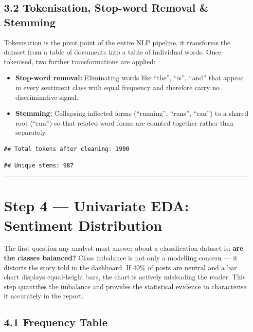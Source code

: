 \documentclass[
]{article}
\providecommand{\tightlist}{%
  \setlength{\itemsep}{0pt}\setlength{\parskip}{0pt}}
\begin{document}
\subsection{3.2 Tokenisation, Stop-word Removal \&
Stemming}\label{tokenisation-stop-word-removal-stemming}

Tokenisation is the pivot point of the entire NLP pipeline, it
transforms the dataset from a table of documents into a table of
individual words. Once tokenised, two further transformations are
applied:

\begin{itemize}
\tightlist
\item
  \textbf{Stop-word removal:} Eliminating words like ``the'', ``is'',
  ``and'' that appear in every sentiment class with equal frequency and
  therefore carry no discriminative signal.
\item
  \textbf{Stemming:} Collapsing inflected forms (``running'', ``runs'',
  ``ran'') to a shared root (``run'') so that related word forms are
  counted together rather than separately.
\end{itemize}

\begin{verbatim}
## Total tokens after cleaning: 1900
\end{verbatim}

\begin{verbatim}
## Unique stems: 987
\end{verbatim}

\begin{center}\rule{0.5\linewidth}{0.5pt}\end{center}

\section{Step 4 --- Univariate EDA: Sentiment
Distribution}\label{step-4-univariate-eda-sentiment-distribution}

The first question any analyst must answer about a classification
dataset is: \textbf{are the classes balanced?} Class imbalance is not
only a modelling concern --- it distorts the story told in the
dashboard. If 40\% of posts are neutral and a bar chart displays
equal-height bars, the chart is actively misleading the reader. This
step quantifies the imbalance and provides the statistical evidence to
characterise it accurately in the report.

\subsection{4.1 Frequency Table}\label{frequency-table}
\end{document}
